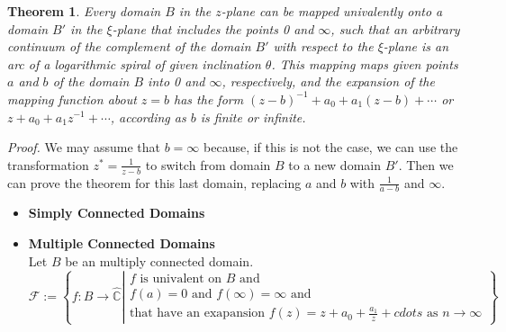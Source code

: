 \documentclass[
]{book}
\providecommand{\tightlist}{%
  \setlength{\itemsep}{0pt}\setlength{\parskip}{0pt}}
\newtheorem{theorem}{Theorem}[chapter]
\theoremstyle{definition}
\theoremstyle{definition}
\theoremstyle{definition}
\theoremstyle{definition}
\theoremstyle{remark}
\begin{document}
\begin{theorem}
\protect\hypertarget{thm:unnamed-chunk-73}{}\label{thm:unnamed-chunk-73}Every domain \(B\) in the \(z\)-plane can be mapped univalently onto a domain \(B'\) in the \(\xi\)-plane that includes the points 0 and \(\infty\), such that an arbitrary continuum of the complement of the domain \(B'\) with respect to the \(\xi\)-plane is an arc of a logarithmic spiral of given inclination \(\theta\). This mapping maps given points \(a\) and \(b\) of the domain \(B\) into 0 and \(\infty\), respectively, and the expansion of the mapping function about \(z = b\) has the form \((z - b)^{-1} + a_0 + a_1 (z - b) + \cdots\) or \(z + a_0 + a_1 z^{-1} + \cdots\), according as \(b\) is finite or infinite.
\end{theorem}

\emph{Proof.} We may assume that \(b = \infty\) because, if this is not the case, we can use the transformation \(z^* = \frac{1}{z - b}\) to switch from domain \(B\) to a new domain \(B'\). Then we can prove the theorem for this last domain, replacing \(a\) and \(b\) with \(\frac{1}{a-b}\) and \(\infty\).

\begin{itemize}
\tightlist
\item
  \textbf{Simply Connected Domains}
\item
  \textbf{Multiple Connected Domains}\\
  Let \(B\) be an multiply connected domain.
  \[\mathcal{F}:=\left\{ f:B \rightarrow \hat{\mathbb{C}}\left|
  \begin{array}{l}
  f \text{ is univalent on  } B \text { and } \\
  f(a)=0 \text{ and } f(\infty)=\infty \text { and }\\ 
  \text{that have an exapansion }f(z)=z+a_0+\frac{a_1}{z}+cdots \text{ as } n\rightarrow \infty\end{array}\right. \right\}\]
\end{itemize}

  
\end{document}
